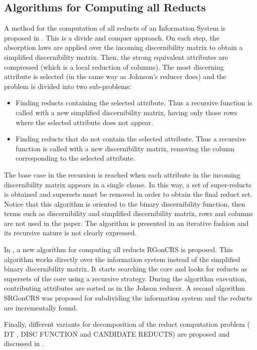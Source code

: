 \documentclass[citenumber]{llncs}
\makeatletter
\newcommand{\setword}[2]{%
  \phantomsection
  #1\def\@currentlabel{\unexpanded{#1}}\label{#2}%
}
\makeatother
\begin{document}
  \subsection{Algorithms for Computing all Reducts}
    A method for the computation of all reducts of an Information System is proposed in \cite{Starzyk99,Starzyk00}. This is a divide and conquer approach. On each step, the absorption laws are applied over the incoming discernibility matrix to obtain a simplified discernibility matrix. Then, the strong equivalent attributes are compressed (which is a local reduction of columns). The most discerning attribute is selected (in the same way as Johnson's reducer does) and the problem is divided into two sub-problems: 
    \begin{itemize}
    \item Finding reducts containing the selected attribute. Thus a recursive function is called with a new simplified discernibility matrix, having only those rows where the selected attribute does not appear.
    \item Finding reducts that do not contain the selected attribute. Thus a recursive function is called with a new 
    discernibility matrix, removing the column corresponding to the selected attribute.
    \end{itemize}
    The base case in the recursion is reached when each attribute in the incoming discernibility matrix appears in a single clause. In this way, a set of super-reducts is obtained and supersets must be removed in order to obtain the final reduct set.
    Notice that this algorithm is oriented to the binary discernibility function, then terms such as discernibility and simplified discernibility matrix, rows and columns are not used in the paper. The algorithm is presented in an iterative fashion and its recursive nature is not clearly expressed.
    
    In \cite{WangP07}, a new algorithm for computing all reducts \setword{RGonCRS}{RGonCRS} is proposed. This algorithm works directly over the information system instead of the simplified binary discernibility matrix. It starts searching the core and looks for reducts as supersets of the core using  a recursive strategy. During the algorithm execution, contributing attributes are sorted as in the Johson reducer. A second algorithm \setword{SRGonCRS}{SRGonCRS} was proposed for subdividing the information system and the reducts are incrementally found.
    
    Finally, different variants for decomposition of the reduct computation problem  (\setword{DT}{DT}, DISC FUNCTION and CANDIDATE REDUCTS) are proposed and discussed in \cite{Strakowski08}.
  
\end{document}
